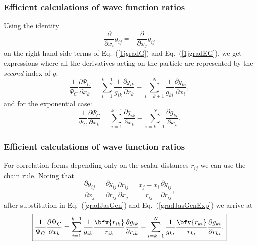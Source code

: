 \frame
 {
   \frametitle{Efficient calculations of wave function ratios}
 \begin{small}
 {\scriptsize
Using the identity 
\begin{equation}\label{firstDerIdentity}
\frac{\partial}{\partial x_i}g_{ij} = -\frac{\partial}{\partial x_j}g_{ij} 
\end{equation}
on the right hand side terms of Eq.~(\ref{1jgradG}) and Eq.~(\ref{1jgradEG}), we get expressions where all the derivatives acting on the particle  are represented by the
\emph{second} index of $g$:
\begin{equation}\label{gradJasGen}
\boxed{
\frac{1}{\Psi_C}\frac{\partial \Psi_C}{\partial x_k} =
\sum_{i=1}^{k-1}\frac{1}{g_{ik}}\frac{\partial g_{ik}}{\partial x_k}
-
\sum_{i=k+1}^{N}\frac{1}{g_{ki}}\frac{\partial g_{ki}}{\partial x_i},
}
\end{equation}
and for the exponential case:
\begin{equation}\label{gradJasGenExp}
\boxed{
\frac{1}{\Psi_C}\frac{\partial \Psi_C}{\partial x_k} =
\sum_{i=1}^{k-1}\frac{\partial g_{ik}}{\partial x_k}
-
\sum_{i=k+1}^{N}\frac{\partial g_{ki}}{\partial x_i}.
}
\end{equation}
 }
 \end{small}
 }
\frame
 {
   \frametitle{Efficient calculations of wave function ratios}
 \begin{small}
 {\scriptsize

For correlation forms depending only on the scalar distances $r_{ij}$ we can use the chain rule. Noting that 
\begin{equation}\label{chainRule}
\frac{\partial g_{ij}}{\partial x_j} = \frac{\partial g_{ij}}{\partial r_{ij}} \frac{\partial r_{ij}}{\partial x_j} = \frac{x_j - x_i}{r_{ij}} \frac{\partial g_{ij}}{\partial r_{ij}},
\end{equation}
after substitution in Eq.~(\ref{gradJasGen}) and Eq.~(\ref{gradJasGenExp}) we arrive at
\begin{equation}\label{generalCorrelation}
\boxed{
\frac{1}{\Psi_C}\frac{\partial \Psi_C}{\partial x_k} = 
\sum_{i=1}^{k-1}\frac{1}{g_{ik}} \frac{\bfv{r_{ik}}}{r_{ik}} \frac{\partial g_{ik}}{\partial r_{ik}}
-
\sum_{i=k+1}^{N}\frac{1}{g_{ki}}\frac{\bfv{r_{ki}}}{r_{ki}}\frac{\partial g_{ki}}{\partial r_{ki}}.
}
\end{equation}
 }
 \end{small}
 }
\frame
